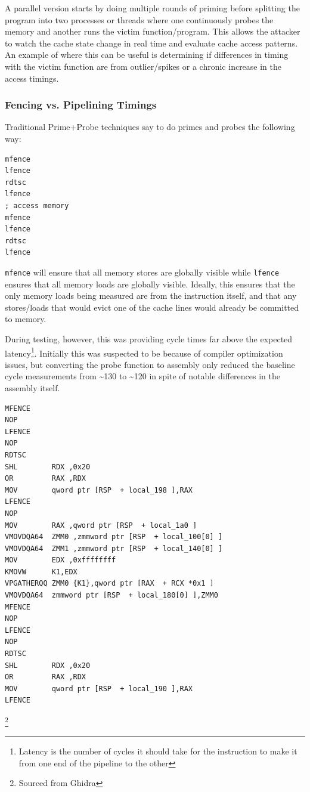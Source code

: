 \documentclass[article]{IEEEtran}
\begin{document}
A parallel version starts by doing multiple rounds of priming before splitting the program into two processes or threads where one continuously probes the memory and another runs the victim function/program. This allows the attacker to watch the cache state change in real time and evaluate cache access patterns. An example of where this can be useful is determining if differences in timing with the victim function are from outlier/spikes or a chronic increase in the access timings.

\subsubsection{Fencing vs. Pipelining Timings}
Traditional Prime+Probe techniques say to do primes and probes the following way:
\begin{lstlisting}[language={[x86masm]Assembler}, caption=Fenced rdtsc example]
mfence
lfence
rdtsc
lfence
; access memory
mfence
lfence
rdtsc
lfence
\end{lstlisting}

\texttt{mfence} will ensure that all memory stores are globally visible while \texttt{lfence} ensures that all memory loads are globally visible. Ideally, this ensures that the only memory loads being measured are from the instruction itself, and that any stores/loads that would evict one of the cache lines would already be committed to memory.

During testing, however, this was providing cycle times far above the expected latency\footnote{Latency is the number of cycles it should take for the instruction to make it from one end of the pipeline to the other}. Initially this was suspected to be because of compiler optimization issues, but converting the probe function to assembly only reduced the baseline cycle measurements from \textasciitilde130 to \textasciitilde120 in spite of notable differences in the assembly itself.

\begin{lstlisting}[language={[x86masm]Assembler}, caption=Compiled C probe asm]
MFENCE
NOP
LFENCE
NOP
RDTSC
SHL        RDX ,0x20
OR         RAX ,RDX
MOV        qword ptr [RSP  + local_198 ],RAX
LFENCE
NOP
MOV        RAX ,qword ptr [RSP  + local_1a0 ]
VMOVDQA64  ZMM0 ,zmmword ptr [RSP  + local_100[0] ]
VMOVDQA64  ZMM1 ,zmmword ptr [RSP  + local_140[0] ]
MOV        EDX ,0xffffffff
KMOVW      K1,EDX
VPGATHERQQ ZMM0 {K1},qword ptr [RAX  + RCX *0x1 ]
VMOVDQA64  zmmword ptr [RSP  + local_180[0] ],ZMM0
MFENCE
NOP
LFENCE
NOP
RDTSC
SHL        RDX ,0x20
OR         RAX ,RDX
MOV        qword ptr [RSP  + local_190 ],RAX
LFENCE
\end{lstlisting}\footnote{Sourced from Ghidra}
\end{document}
